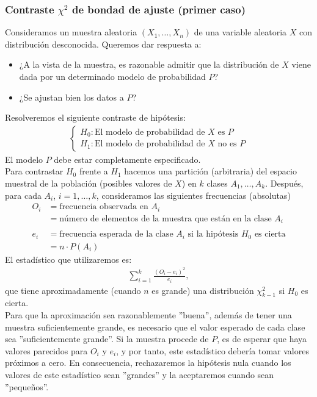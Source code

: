 \subsubsection{Contraste $\chi^2$ de bondad de ajuste (primer caso)}

\noindent Consideramos un muestra aleatoria $(X_1,\ldots, X_n)$ de una variable aleatoria $X$ con distribución desconocida. Queremos dar respuesta a: 
\begin{itemize}
    \item ¿A la vista de la muestra, es razonable admitir que la distribución de $X$ viene dada por un determinado modelo de probabilidad $P$?
    \item ¿Se ajustan bien los datos a $P$?
\end{itemize}
Resolveremos el siguiente contraste de hipótesis:
\begin{align*}
    \begin{cases}
        H_0 : \text{El modelo de probabilidad de $X$ es $P$} \\
        H_1 : \text{El modelo de probabilidad de $X$ no es $P$}
    \end{cases}
\end{align*}
El modelo $P$ debe estar completamente especificado.
\\
\newline
Para contrastar $H_0$ frente a $H_1$ hacemos una partición (arbitraria) del espacio muestral de la población (posibles valores de $X$) en $k$ clases $A_1, \ldots, A_k$. Después, para cada $A_i$, $i=1,\ldots,k$, consideramos las siguientes frecuencias (absolutas)
\begin{align*}
    O_i &= \text{frecuencia observada en $A_i$} \\
    &= \text{número de elementos de la muestra que están en la clase $A_i$} \\ \\
    e_i &= \text{frecuencia esperada de la clase $A_i$ si la hipótesis $H_0$ es cierta} \\
    &= n \cdot P(A_i)
\end{align*}
El estadístico que utilizaremos es:
\begin{align*}
    \sum_{i=1}^{k} \frac{(O_i - e_i)^2}{e_i},
\end{align*}
que tiene aproximadamente (cuando $n$ es grande) una distribución $\chi^2_{k-1}$ si $H_0$ es cierta. 
\\
\newline
Para que la aproximación sea razonablemente ''buena'', además de tener una muestra suficientemente grande, es necesario que el valor esperado de cada clase sea ''suficientemente grande''. Si la muestra procede de $P$, es de esperar que haya valores parecidos para $O_i$ y $e_i$, y por tanto, este estadístico debería tomar valores próximos a cero. En consecuencia, rechazaremos la hipótesis nula cuando los valores de este estadístico sean ''grandes'' y la aceptaremos cuando sean ''pequeños''.
